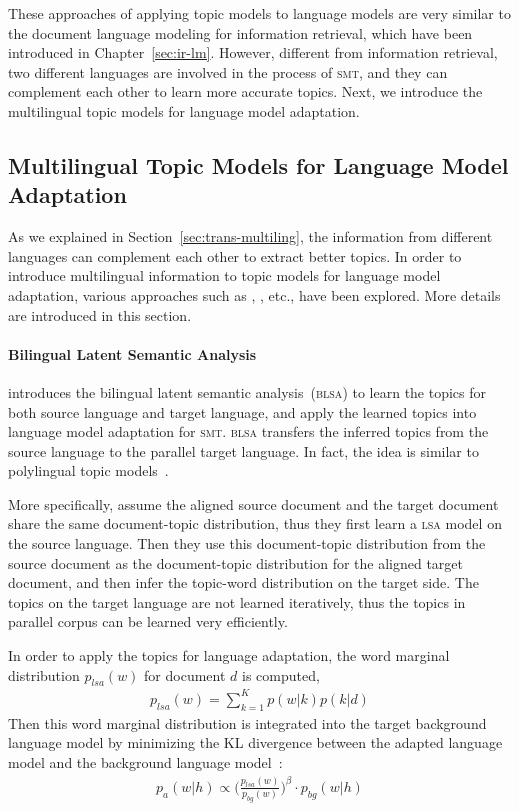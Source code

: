 These approaches of applying topic models to language models are very similar to the document language modeling for information retrieval, which have been introduced in Chapter~\ref{sec:ir-lm}. However, different from information retrieval, two different languages are involved in the process of \textsc{smt}, and they can complement each other to learn more accurate topics. Next, we introduce the multilingual topic models for language model adaptation.

\subsection{Multilingual Topic Models for Language Model Adaptation}

As we explained in Section~\ref{sec:trans-multiling}, the information from different languages can complement each other to extract better topics. In order to introduce multilingual information to topic models for language model adaptation, various approaches such as \cite{Tam-2007}, \cite{Ruiz-2011}, \cite{Yu-2013} etc., have been explored. More details are introduced in this section.


\paragraph{Bilingual Latent Semantic Analysis}

\cite{Tam-2007} introduces the bilingual latent semantic analysis~(\textsc{blsa}) to learn the topics for both source language and target language, and apply the learned topics into language model adaptation for \textsc{smt}. \textsc{blsa} transfers the inferred topics from the source language to the parallel target language. In fact, the idea is similar to polylingual topic models~\citep{mimno-09}.

More specifically, \cite{Tam-2007} assume the aligned source document and the target document share the same document-topic distribution, thus they first learn a \textsc{lsa} model on the source language. Then they use this document-topic distribution from the source document as the document-topic distribution for the aligned target document, and then infer the topic-word distribution on the target side. The topics on the target language are not learned iteratively, thus the topics in parallel corpus can be learned very efficiently. 

In order to apply the topics for language adaptation, the word marginal distribution $p_{lsa}(w)$ for document $d$ is computed,
\begin{align}
p_{lsa}(w) = \sum_{k=1}^K p(w|k) p(k|d)
\end{align}
Then this word marginal distribution is integrated into the target background language model by minimizing the KL divergence between the adapted language model and the background language model~\citep{Kneser-1997b}:
\begin{align}
\label{eq:mdi}
p_a(w|h) \propto \Big( \frac{p_{lsa}(w)}{p_{bg}(w)} \Big) ^{\beta} \cdot p_{bg}(w|h)
\end{align}

